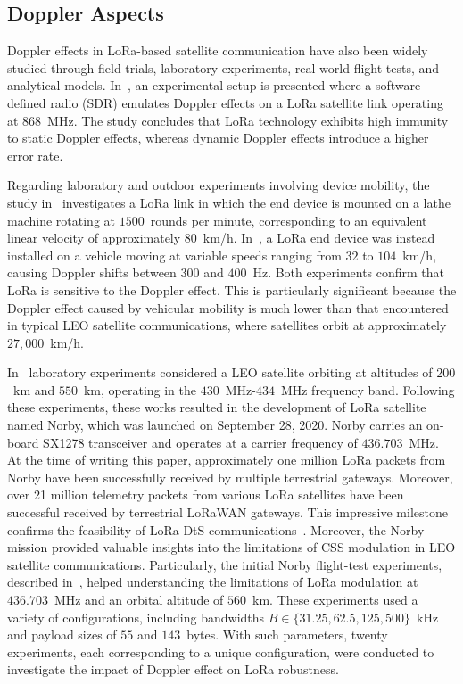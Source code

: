 \documentclass{IEEEtran}
\begin{document}
\subsection{Doppler Aspects}
Doppler effects in \ac{LoRa}-based satellite communication have also been widely studied through field trials, laboratory experiments, real-world flight tests, and analytical models. In~\cite{Colombo.2022}, an experimental setup is presented where a software-defined radio (SDR) emulates Doppler effects on a \ac{LoRa} satellite link operating at $868$~MHz. The study concludes that \ac{LoRa} technology exhibits high immunity to static Doppler effects, whereas dynamic Doppler effects introduce a higher error rate.

Regarding laboratory and outdoor experiments involving device mobility, the study in~\cite{kmdoppler} investigates a \ac{LoRa} link in which the end device is mounted on a lathe machine rotating at $1500$~rounds per minute, corresponding to an equivalent linear velocity of approximately $80$~km/h. In~\cite{V2X}, a \ac{LoRa} end device was instead installed on a vehicle moving at variable speeds ranging from $32$ to $104$~km/h, causing Doppler shifts between $300$ and $400$~Hz. Both experiments confirm that \ac{LoRa} is sensitive to the Doppler effect. This is particularly significant because the Doppler effect caused by vehicular mobility is much lower than that encountered in typical \ac{LEO} satellite communications, where satellites orbit at approximately $27,000$~km/h.

In~\cite{Doroshkin.2019,LoRaDoppler1} laboratory experiments considered a \ac{LEO} satellite orbiting at altitudes of $200$~km and $550$~km, operating in the $430$~MHz-$434$~MHz frequency band. Following these experiments, these works resulted in the development of \ac{LoRa} satellite named Norby, which was launched on September 28, 2020. Norby carries an on-board SX1278 transceiver and operates at a carrier frequency of $436.703$~MHz. At the time of writing this paper, approximately one million \ac{LoRa} packets from Norby have been successfully received by multiple terrestrial gateways. Moreover, over 21 million telemetry packets from various \ac{LoRa} satellites have been successful received by terrestrial \ac{LoRaWAN} gateways. 
This impressive milestone confirms the feasibility of \ac{LoRa} \ac{DtS} communications~\cite{tinygs}. Moreover, the Norby mission provided valuable insights into the limitations of \ac{CSS} modulation in \ac{LEO} satellite communications. Particularly, the initial Norby flight-test experiments, described in~\cite{Norby}, helped understanding the limitations of \ac{LoRa} modulation at $436.703$~MHz and an orbital altitude of $560$~km.   These experiments  used a variety of configurations, including bandwidths $B\in \{ 31.25, 62.5, 125, 500\}$~kHz and payload sizes of $55$ and $143$~bytes. With such parameters, twenty experiments, each corresponding to a unique configuration, were conducted to investigate the impact of Doppler effect on \ac{LoRa} robustness. 
\end{document}
